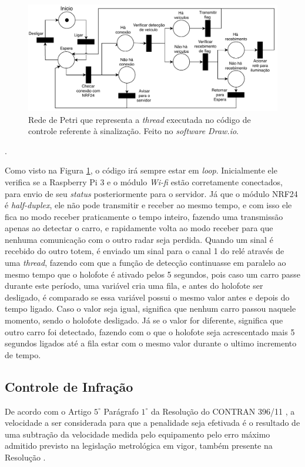 \begin{figure}[H]
    \centering
    \includegraphics[scale = 0.6]{figuras/sinaliza.pdf}
    \caption{Rede de Petri que representa a \emph{thread} executada no código de controle referente à sinalização. Feito no \emph{software Draw.io}.}
    \label{Petrisinaliza}
\end{figure}. 

Como visto na Figura \ref{Petrisinaliza}, o código irá sempre estar em \emph{loop}. Inicialmente ele verifica se a Raspberry Pi 3 e o módulo \emph{Wi-fi} estão corretamente conectados, para envio de seu \emph{status} posteriormente para o servidor. Já que o módulo NRF24 é \emph{half-duplex}, ele não pode transmitir e receber ao mesmo tempo, e com isso ele fica no modo receber praticamente o tempo inteiro, fazendo uma transmissão apenas ao detectar o carro, e rapidamente volta ao modo receber para que nenhuma comunicação com o outro radar seja perdida. Quando um sinal é recebido do outro totem, é enviado um sinal para o canal 1 do relé através de uma \emph{thread}, fazendo com que a função de detecção continuasse em paralelo ao mesmo tempo que o holofote é ativado pelos 5 segundos, pois caso um carro passe durante este período, uma variável cria uma fila, e antes do holofote ser desligado, é comparado se essa variável possui o mesmo valor antes e depois do tempo ligado. Caso o valor seja igual, significa que nenhum carro passou naquele momento, sendo o holofote desligado. Já se o valor for diferente, significa que outro carro foi detectado, fazendo com o que o holofote seja acrescentado mais 5 segundos ligados até a fila estar com o mesmo valor durante o ultimo incremento de tempo.

\subsection{Controle de Infração}
  
De acordo com o Artigo $5^{\circ}$ Parágrafo $1^{\circ}$ da Resolução do CONTRAN 396/11 \cite{conatran}, a velocidade a ser considerada para que a penalidade seja efetivada é o resultado de uma subtração da velocidade medida pelo equipamento pelo erro máximo admitido previsto na legislação metrológica em vigor, também presente na Resolução \cite{conatran}.
   
